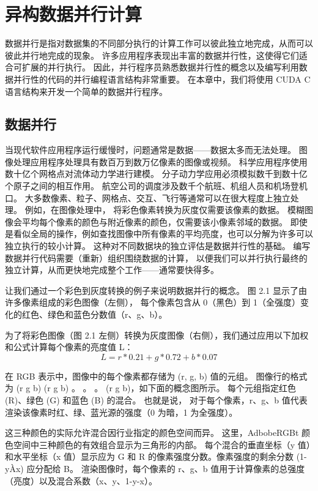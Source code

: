 \section{异构数据并行计算}

数据并行是指对数据集的不同部分执行的计算工作可以彼此独立地完成，从而可以彼此并行地完成的现象。 
许多应用程序表现出丰富的数据并行性，这使得它们适合可扩展的并行执行。 
因此，并行程序员熟悉数据并行性的概念以及编写利用数据并行性的代码的并行编程语言结构非常重要。 
在本章中，我们将使用 CUDA C 语言结构来开发一个简单的数据并行程序。

\subsection{数据并行}
当现代软件应用程序运行缓慢时，问题通常是数据——数据太多而无法处理。 
图像处理应用程序处理具有数百万到数万亿像素的图像或视频。 科学应用程序使用数十亿个网格点对流体动力学进行建模。 
分子动力学应用必须模拟数千到数十亿个原子之间的相互作用。 航空公司的调度涉及数千个航班、机组人员和机场登机口。 
大多数像素、粒子、网格点、交互、飞行等通常可以在很大程度上独立处理。 例如，在图像处理中，
将彩色像素转换为灰度仅需要该像素的数据。 模糊图像会平均每个像素的颜色与附近像素的颜色，仅需要该小像素邻域的数据。 
即使是看似全局的操作，例如查找图像中所有像素的平均亮度，也可以分解为许多可以独立执行的较小计算。 
这种对不同数据块的独立评估是数据并行性的基础。 编写数据并行代码需要（重新）组织围绕数据的计算，
以便我们可以并行执行最终的独立计算，从而更快地完成整个工作——通常要快得多。

让我们通过一个彩色到灰度转换的例子来说明数据并行的概念。 图 2.1 显示了由许多像素组成的彩色图像（左侧），
每个像素包含从 0（黑色）到 1（全强度）变化的红色、绿色和蓝色分数值（r、g、b）。

为了将彩色图像（图 2.1 左侧）转换为灰度图像（右侧），我们通过应用以下加权和公式计算每个像素的亮度值 L：
\begin{equation*}
	L = r*0.21 + g*0.72 + b * 0.07
\end{equation*}

\begin{remark}
在 RGB 表示中，图像中的每个像素都存储为 (r, g, b) 值的元组。 
图像行的格式为 (r g b) (r g b) 。 。 。 (r g b)，如下面的概念图所示。 
每个元组指定红色 (R)、绿色 (G) 和蓝色 (B) 的混合。 也就是说，
对于每个像素，r、g、b 值代表渲染该像素时红、绿、蓝光源的强度（0 为暗，1 为全强度）。

这三种颜色的实际允许混合因行业指定的颜色空间而异。 这里，AdbobeRGBt 颜色空间中三种颜色的有效组合显示为三角形的内部。 
每个混合的垂直坐标（y 值）和水平坐标（x 值）显示应为 G 和 R 的像素强度分数。像素强度的剩余分数 (1-yÀx) 应分配给 B。 
渲染图像时，每个像素的 r、g、b 值用于计算像素的总强度（亮度）以及混合系数（x、y、1-y-x）。
\end{remark}

